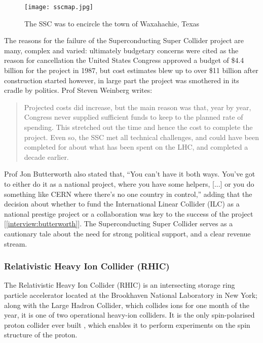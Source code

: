 \begin{figure}[!htb]
\centering
\texttt{[image: sscmap.jpg]}
\caption{The SSC was to encircle the town of Waxahachie, Texas \cite{SSC:SI:Online}}
\end{figure}

The reasons for the failure of the Superconducting Super Collider project are many, complex and varied: ultimately budgetary concerns were cited as the reason for cancellation \textendash the United States Congress approved a budget of \$4.4 billion \cite{SSC:BE} for the project in 1987, but cost estimates blew up to over \$11 billion \cite{SSC:LAT:Online} after construction started \textendash however, in large part the project was smothered in its cradle by politics. Prof Steven Weinberg writes:

\begin{quote}
Projected costs did increase, but the main reason was that, year by year, Congress never supplied sufficient funds to keep to the planned rate of spending. This stretched out the time and hence the cost to complete the project. Even so, the SSC met all technical challenges, and could have been completed for about what has been spent on the LHC, and completed a decade earlier. \cite{SSC:Weinberg:Online}
\end{quote}

Prof Jon Butterworth also stated that, ``You can't have it both ways. You've got to either do it as a national project, where you have some helpers, [...] or you do something like CERN where there's no one country in control,'' adding that the decision about whether to fund the International Linear Collider (ILC) as a national prestige project or a collaboration was key to the success of the project [\ref{interview:butterworth}]. The Superconducting Super Collider serves as a cautionary tale about the need for strong political support, and a clear revenue stream.

\subsubsection{Relativistic Heavy Ion Collider (RHIC)}
The Relativistic Heavy Ion Collider (RHIC) is an intersecting storage ring particle accelerator located at the Brookhaven National Laboratory in New York; along with the Large Hadron Collider, which collides ions for one month of the year, it is one of two operational heavy-ion colliders. It is the only spin-polarised proton collider ever built \cite{RHIC:Spin}, which enables it to perform experiments on the spin structure of the proton.

